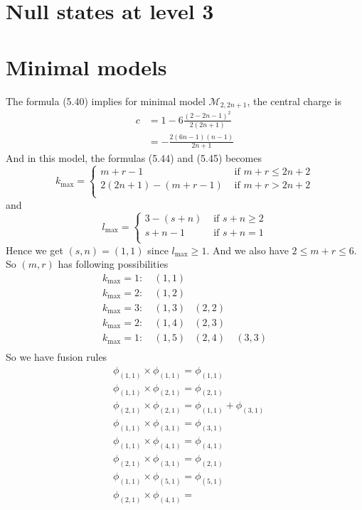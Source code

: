 \section{Null states at level 3}
\section{Minimal models}
The formula (5.40) implies for minimal model $\mathcal{M}_{2,2n+1}$, the central charge is 
\[
\begin{aligned}
c & = 1 - 6 \frac{(2-2n-1)^2}{2(2n+1)}\\
& =  - \frac{2(6n-1)(n-1)}{2n+1}
\end{aligned}
\]
And in this model, the formulas (5.44) and (5.45) becomes
\[
k_{\text{max}} = \begin{cases}
m+r -1 & \text{ if } m+r \leq 2n+2\\
2(2n+1) -(m+r-1) & \text{ if } m+r > 2n+2\\
\end{cases}
\]
and 
\[
l_{\text{max}} = \begin{cases}
3-(s+n) & \text{ if } s+n \geq 2\\
s+n-1& \text{ if } s+n = 1 \\
\end{cases}
\]
Hence we get $(s,n)= (1,1)$ since $l_{\text{max}} \geq 1$. And we also have $2 \leq m+r \leq 6$. So $(m,r)$ has following possibilities
\[
\begin{aligned}
k_{\text{max}}= 1:\ &(1,1) & &\\
k_{\text{max}}= 2:\ &(1,2) & &\\
k_{\text{max}}= 3:\ &(1,3) &(2,2)&\\
k_{\text{max}}= 2:\ &(1,4) & (2,3)&\\
k_{\text{max}}= 1:\ &(1,5) & (2,4) &\ (3,3)\\
\end{aligned}
\]
So we have fusion rules
\[
\begin{aligned}
 &\phi_{(1,1)} \times \phi_{(1,1)} = \phi_{(1,1)}\\
 & \phi_{(1,1)} \times \phi_{(2,1)} = \phi_{(2,1)}\\
 & \phi_{(2,1)} \times \phi_{(2,1)} = \phi_{(1,1)} + \phi_{(3,1)}\\
 & \phi_{(1,1)} \times \phi_{(3,1)} = \phi_{(3,1)}\\
 & \phi_{(1,1)} \times \phi_{(4,1)} = \phi_{(4,1)} \\
 & \phi_{(2,1)} \times \phi_{(3,1)} = \phi_{(2,1)} \\
 & \phi_{(1,1)} \times \phi_{(5,1)} = \phi_{(5,1)} \\
 & \phi_{(2,1)} \times \phi_{(4,1)} = \
\end{aligned}
\]